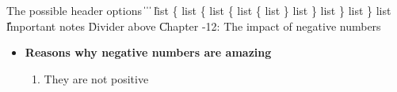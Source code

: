 \documentclass{noted}
\begin{document}
The possible header options \|
 \|
 \|
 \|

list \{
	\> list \{
		\> list \{
			\> list \{
				\> list
			\} \> list
		\} \> list
	\} \> list
\}
list 
\|
\r{Important notes}
\cline
\r{Divider above}
\|
{\Large Chapter -12: The impact of negative numbers}
\begin{itemize}
	\item \textbf{Reasons why negative numbers are amazing}
	\begin{enumerate}
		\item {\large They are not positive}
	\end{enumerate}
\end{itemize}
\end{document}
